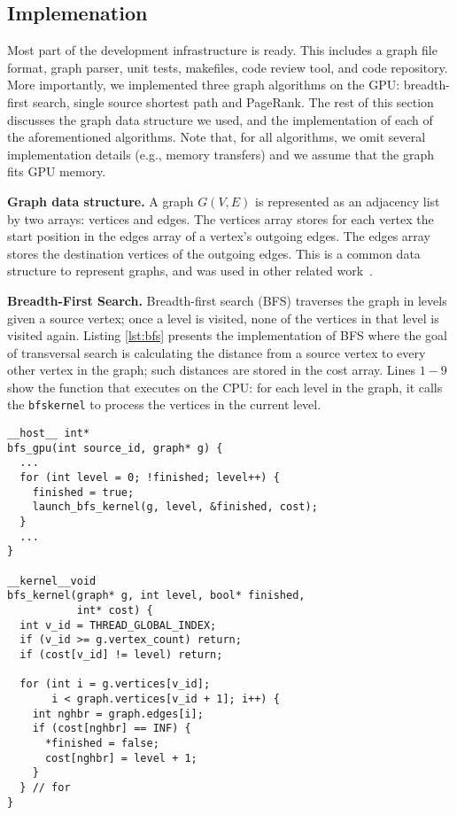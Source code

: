 \subsection{Implemenation}
\label{sec:implementation}

Most part of the development infrastructure is ready. This includes a graph file format, graph parser, unit tests, makefiles, code review tool, and code repository. More importantly, we implemented three graph algorithms on the GPU: breadth-first search, single source shortest path and PageRank. The rest of this section discusses the graph data structure we used, and the implementation of each of the aforementioned algorithms. Note that, for all algorithms, we omit several implementation details (e.g., memory transfers) and we assume that the graph fits GPU memory.

\textbf{Graph data structure.} A graph $G(V,E)$ is represented as an adjacency list by two arrays: vertices and edges. The vertices array stores for each vertex the start position in the edges array of a vertex's outgoing edges. The edges array stores the destination vertices of the outgoing edges. This is a common data structure to represent graphs, and was used in other related work~\cite{Harish2007, Sungpack2010}.

{\bf Breadth-First Search.} Breadth-first search (BFS) traverses the graph in levels given a source vertex; once a level is visited, none of the vertices in that level is visited again. Listing \ref{lst:bfs} presents the implementation of BFS where the goal of transversal search is calculating the distance from a source vertex to every other vertex in the graph; such distances are stored in the cost array. Lines $1-9$ show the function that executes on the CPU: for each level in the graph, it calls the \texttt{bfskernel} to process the vertices in the current level.


\begin{lstlisting}[caption=Breadth-First Search Implementation,label=lst:bfs]
__host__ int*
bfs_gpu(int source_id, graph* g) {
  ...
  for (int level = 0; !finished; level++) {
    finished = true;
    launch_bfs_kernel(g, level, &finished, cost);
  }
  ...
}

__kernel__void
bfs_kernel(graph* g, int level, bool* finished,
           int* cost) {
  int v_id = THREAD_GLOBAL_INDEX;
  if (v_id >= g.vertex_count) return;
  if (cost[v_id] != level) return;

  for (int i = g.vertices[v_id]; 
       i < graph.vertices[v_id + 1]; i++) {
    int nghbr = graph.edges[i];
    if (cost[nghbr] == INF) {
      *finished = false;
      cost[nghbr] = level + 1;
    }
  } // for
}
\end{lstlisting}

